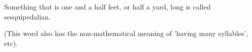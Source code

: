 Something that is one and a half feet, or half a yard, long is called
sesquipedalian.
\par
(This word also has the non-mathematical meaning of 'having many
syllables', etc).